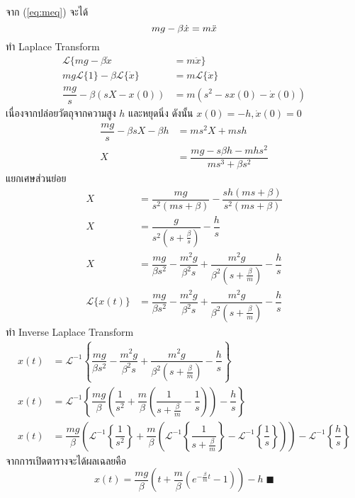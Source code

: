 \documentclass[a4paper,12pt]{article}
\begin{document}
จาก (\ref{eq:meq}) จะได้
\begin{equation*}
	mg-\beta\dot{x}=m\ddot{x}\\
\end{equation*}
ทำ Laplace Transform
\begin{align*}
	\mathscr{L}\{mg-\beta\dot{x}                    & =m\ddot{x}\}              \\
	mg\mathscr{L}\{1\}-\beta \mathscr{L}\{\dot{x}\} & =m\mathscr{L}\{\ddot{x}\} \\
	\dfrac{mg}{s}-\beta(sX-x(0))                    & =m(s^2-sx(0)-\dot{x}(0))
\end{align*}
เนื่องจากปล่อยวัตถุจากความสูง $h$ และหยุดนิ่ง ดังนั้น $x(0)=-h, \dot{x}(0)=0$
\begin{align*}
	\dfrac{mg}{s}-\beta sX-\beta h & =ms^2X+msh                                 \\
	X                              & =\dfrac{mg-s\beta h-mhs^2}{ms^3+\beta s^2}
\end{align*}
แยกเศษส่วนย่อย
\begin{align*}
	X                   & =\dfrac{mg}{s^2(ms+\beta)}-\dfrac{sh(ms+\beta)}{s^2(ms+\beta)}                                      \\
	X                   & =\dfrac{g}{s^2(s+\frac{\beta}{s})}-\dfrac{h}{s}                                                     \\
	X                   & =\dfrac{mg}{\beta s^2}-\dfrac{m^2g}{\beta^2s}+\dfrac{m^2g}{\beta^2(s+\frac{\beta}{m})}-\dfrac{h}{s} \\
	\mathscr{L}\{x(t)\} & =\dfrac{mg}{\beta s^2}-\dfrac{m^2g}{\beta^2s}+\dfrac{m^2g}{\beta^2(s+\frac{\beta}{m})}-\dfrac{h}{s}
\end{align*}
ทำ Inverse Laplace Transform
\begin{align*}
	x(t) & =\mathscr{L}^{-1}\left\{\dfrac{mg}{\beta s^2}-\dfrac{m^2g}{\beta^2s}+\dfrac{m^2g}{\beta^2(s+\frac{\beta}{m})}-\dfrac{h}{s}\right\}                                                                                                                            \\	x(t)&=\mathscr{L}^{-1}\left\{\dfrac{mg}{\beta}\left(\dfrac{1}{s^2}+\dfrac{m}{\beta}\left(\dfrac{1}{s+\frac{\beta}{m}}-\dfrac{1}{s}\right)\right)-\dfrac{h}{s}\right\}\\
	x(t) & =\dfrac{mg}{\beta}\left(\mathscr{L}^{-1}\left\{\dfrac{1}{s^2}\right\}+\dfrac{m}{\beta}\left(\mathscr{L}^{-1}\left\{\dfrac{1}{s+\frac{\beta}{m}}\right\}-\mathscr{L}^{-1}\left\{\dfrac{1}{s}\right\}\right)\right)-\mathscr{L}^{-1}\left\{\dfrac{h}{s}\right\}
\end{align*}
จากการเปิดตารางจะได้ผลเฉลยคือ
\begin{equation*}
	x(t)=\dfrac{mg}{\beta}\left(t+\dfrac{m}{\beta}\left(e^{-\frac{\beta}{m}t}-1\right)\right)-h\;\blacksquare
\end{equation*}
\end{document}
